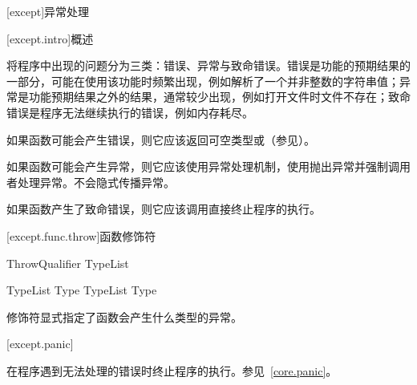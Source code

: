 
[except]{异常处理}

[except.intro]{概述}

\pnum
\X 将程序中出现的问题分为三类：错误、异常与致命错误。错误是功能的预期结果的一部分，可能在使用该功能时频繁出现，例如解析了一个并非整数的字符串值；异常是功能预期结果之外的结果，通常较少出现，例如打开文件时文件不存在；致命错误是程序无法继续执行的错误，例如内存耗尽。

\pnum
如果函数可能会产生错误，则它应该返回可空类型或（参见）。

\pnum
如果函数可能会产生异常，则它应该使用异常处理机制，使用抛出异常并强制调用者处理异常。\X 不会隐式传播异常。

\pnum
如果函数产生了致命错误，则它应该调用直接终止程序的执行。

[except.func.throw]{函数修饰符}

\begin{bnf}{ThrowQualifier}
     \terminal{(} TypeList\bnfs \terminal{)} \br
\end{bnf}

\begin{bnf}{TypeList}
    Type \br
    TypeList \terminal{,} Type
\end{bnf}

\pnum
{}修饰符显式指定了函数会产生什么类型的异常。

[except.panic]{}

\pnum
{}在程序遇到无法处理的错误时终止程序的执行。参见~\ref{core.panic}。